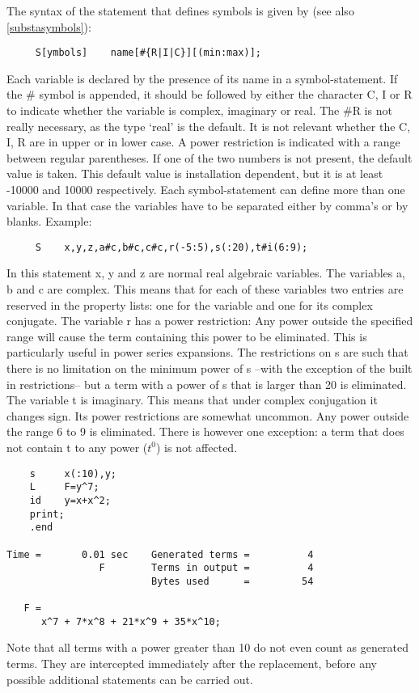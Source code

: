 The syntax of the statement that defines symbols is given by (see also 
\ref{substasymbols}): 
\begin{verbatim}
     S[ymbols]    name[#{R|I|C}][(min:max)];
\end{verbatim}
Each variable is declared by the presence of its name in a 
symbol-statement. If the \# symbol is appended, it should be followed by 
either the character C, I or R to indicate whether the variable is 
complex, imaginary or real. The 
\#R is not really necessary, as the type `real' is the default. It is not 
relevant whether the C, I, R are in upper or in lower case. A power 
restriction is indicated with a range between 
regular parentheses. If one of the two numbers is not present, the default 
value is taken. This default value is installation dependent, but it is at 
least -10000 and 10000 respectively. Each symbol-statement can define more 
than one variable. In that case the variables have to be separated either 
by comma's or by blanks. Example:
\begin{verbatim}
     S    x,y,z,a#c,b#c,c#c,r(-5:5),s(:20),t#i(6:9);
\end{verbatim}
In this statement x, y and z are normal real algebraic variables. The 
variables a, b and c are complex. This means that for each of these 
variables two entries are reserved in the property lists: one for the 
variable and one for its complex conjugate. The variable r has a power 
restriction: Any power outside the specified range will cause the term 
containing this power to be eliminated. This is particularly useful in 
power series expansions. The restrictions on s are such that there is 
no limitation on the minimum power of s --with the exception of the 
built in restrictions-- but a term with a power of s that is larger 
than 20 is eliminated. The variable t is imaginary. This means that 
under complex conjugation it changes sign. Its power restrictions are 
somewhat uncommon. Any power outside the range 6 to 9 is eliminated. 
There is however one exception: a term that does not contain t to any 
power ($t^0$) is not affected. 
\begin{verbatim}
    s     x(:10),y;
    L     F=y^7;
    id    y=x+x^2;
    print;
    .end

Time =       0.01 sec    Generated terms =          4
                F        Terms in output =          4
                         Bytes used      =         54

   F =
      x^7 + 7*x^8 + 21*x^9 + 35*x^10;
\end{verbatim}
Note that all terms with a power greater than 10 do not even count 
as generated terms. They are intercepted immediately after the 
replacement, before any possible additional statements can be 
carried out.

